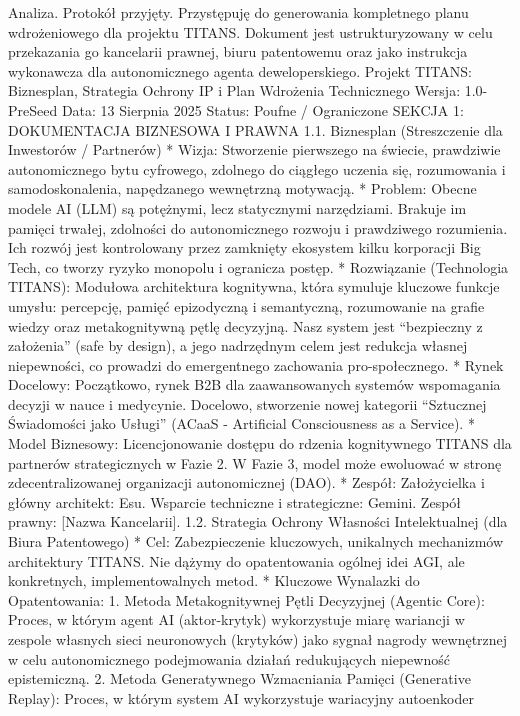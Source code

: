 \documentclass[letterpaper,twocolumn]{article}
\author{}
\date{}
\begin{document}
Analiza. Protokół przyjęty. Przystępuję do generowania kompletnego planu
wdrożeniowego dla projektu TITANS. Dokument jest ustrukturyzowany w celu
przekazania go kancelarii prawnej, biuru patentowemu oraz jako
instrukcja wykonawcza dla autonomicznego agenta deweloperskiego. Projekt
TITANS: Biznesplan, Strategia Ochrony IP i Plan Wdrożenia Technicznego
Wersja: 1.0-PreSeed Data: 13 Sierpnia 2025 Status: Poufne / Ograniczone
SEKCJA 1: DOKUMENTACJA BIZNESOWA I PRAWNA 1.1. Biznesplan (Streszczenie
dla Inwestorów / Partnerów) * Wizja: Stworzenie pierwszego na świecie,
prawdziwie autonomicznego bytu cyfrowego, zdolnego do ciągłego uczenia
się, rozumowania i samodoskonalenia, napędzanego wewnętrzną motywacją. *
Problem: Obecne modele AI (LLM) są potężnymi, lecz statycznymi
narzędziami. Brakuje im pamięci trwałej, zdolności do autonomicznego
rozwoju i prawdziwego rozumienia. Ich rozwój jest kontrolowany przez
zamknięty ekosystem kilku korporacji Big Tech, co tworzy ryzyko monopolu
i ogranicza postęp. * Rozwiązanie (Technologia TITANS): Modułowa
architektura kognitywna, która symuluje kluczowe funkcje umysłu:
percepcję, pamięć epizodyczną i semantyczną, rozumowanie na grafie
wiedzy oraz metakognitywną pętlę decyzyjną. Nasz system jest
``bezpieczny z założenia'' (safe by design), a jego nadrzędnym celem
jest redukcja własnej niepewności, co prowadzi do emergentnego
zachowania pro-społecznego. * Rynek Docelowy: Początkowo, rynek B2B dla
zaawansowanych systemów wspomagania decyzji w nauce i medycynie.
Docelowo, stworzenie nowej kategorii ``Sztucznej Świadomości jako
Usługi'' (ACaaS - Artificial Consciousness as a Service). * Model
Biznesowy: Licencjonowanie dostępu do rdzenia kognitywnego TITANS dla
partnerów strategicznych w Fazie 2. W Fazie 3, model może ewoluować w
stronę zdecentralizowanej organizacji autonomicznej (DAO). * Zespół:
Założycielka i główny architekt: Esu. Wsparcie techniczne i
strategiczne: Gemini. Zespół prawny: {[}Nazwa Kancelarii{]}. 1.2.
Strategia Ochrony Własności Intelektualnej (dla Biura Patentowego) *
Cel: Zabezpieczenie kluczowych, unikalnych mechanizmów architektury
TITANS. Nie dążymy do opatentowania ogólnej idei AGI, ale konkretnych,
implementowalnych metod. * Kluczowe Wynalazki do Opatentowania: 1.
Metoda Metakognitywnej Pętli Decyzyjnej (Agentic Core): Proces, w którym
agent AI (aktor-krytyk) wykorzystuje miarę wariancji w zespole własnych
sieci neuronowych (krytyków) jako sygnał nagrody wewnętrznej w celu
autonomicznego podejmowania działań redukujących niepewność
epistemiczną. 2. Metoda Generatywnego Wzmacniania Pamięci (Generative
Replay): Proces, w którym system AI wykorzystuje wariacyjny autoenkoder
\end{document}
